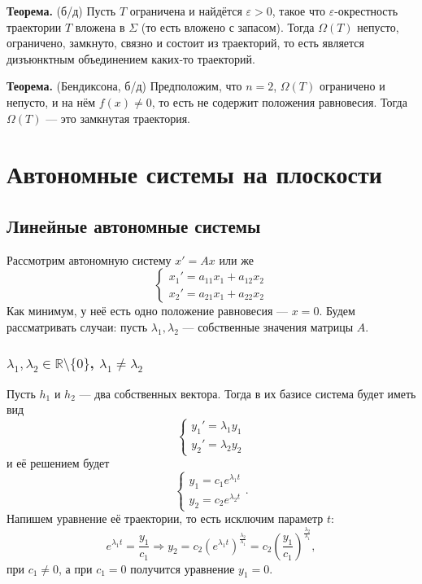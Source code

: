 \textbf{Теорема.} (б/д) Пусть $T$ ограничена и найдётся $\varepsilon > 0$, такое что $\varepsilon$-окрестность траектории $T$ вложена в $\Sigma$ (то есть вложено с запасом).
Тогда $\Omega(T)$ непусто, ограничено, замкнуто, связно и состоит из траекторий, то есть является дизъюнктным объединением каких-то траекторий.

\textbf{Теорема.} (Бендиксона, б/д) Предположим, что $n = 2$, $\Omega(T)$ ограничено и непусто, и на нём $f(x) \ne 0$, то есть не содержит положения равновесия.
Тогда $\Omega(T)$ --- это замкнутая траектория.

\setcounter{equation}{0}
\section{Автономные системы на плоскости}
\subsection{Линейные автономные системы}
Рассмотрим автономную систему $x' = Ax$ или же
\[
    \begin{cases}
        x_1' = a_{11} x_1 + a_{12} x_2 \\
        x_2' = a_{21} x_1 + a_{22} x_2
    \end{cases}
\]
Как минимум, у неё есть одно положение равновесия --- $x = 0$.
Будем рассматривать случаи: пусть $\lambda_1, \lambda_2$ --- собственные значения матрицы $A$.

\subsubsection{$\lambda_1, \lambda_2 \in \mathbb R \setminus \{0\}$, $\lambda_1 \ne \lambda_2$}
Пусть $h_1$ и $h_2$ --- два собственных вектора.
Тогда в их базисе система будет иметь вид
\[
    \begin{cases}
        y_1' = \lambda_1 y_1 \\
        y_2' = \lambda_2 y_2
    \end{cases}
\]
и её решением будет
\[
    \begin{cases}
        y_1 = c_1 e^{\lambda_1 t} \\
        y_2 = c_2 e^{\lambda_2 t}
    \end{cases} .
\]
Напишем уравнение её траектории, то есть исключим параметр $t$:
\[
    e^{\lambda_1 t} = \frac{y_1}{c_1} \Rightarrow y_2 = c_2(e^{\lambda_1 t})^{\frac{\lambda_2}{\lambda_1}} = c_2 \left(\frac{y_1}{c_1} \right)^{\frac{\lambda_2}{\lambda_1}}, 
\]
при $c_1 \ne 0$, а при $c_1 = 0$ получится уравнение $y_1 = 0$.


